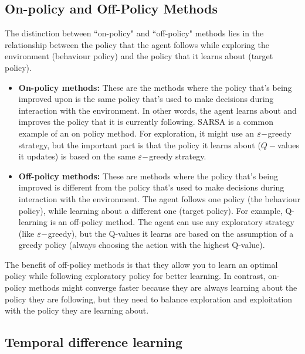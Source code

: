\subsection{On-policy and Off-Policy Methods}
The distinction between ``on-policy" and ``off-policy" methods lies in the relationship between the policy that the agent follows while exploring the environment (behaviour policy) and the policy that it learns about (target policy). 

\begin{itemize}
    \item \textbf{On-policy methods:} 
    These are the methods where the policy that's being improved upon is the same policy that's used to make decisions during interaction with the environment. In other words, the agent learns about and improves the policy that it is currently following. SARSA is a common example of an on policy method. For exploration, it might use an $\varepsilon-$greedy strategy, but the important part is that the policy it learns about ($Q-$values it updates) is based on the same $\varepsilon-$greedy strategy. 

    \item \textbf{Off-policy methods:} 
    These are methods where the policy that's being improved is different from the policy that's used to make decisions during interaction with the environment.
    The agent follows one policy (the behaviour policy), while learning about a different one (target policy). 
    For example, Q-learning is an off-policy method. The agent can use any exploratory strategy (like $\varepsilon-$greedy), but the Q-values it learns are based on the assumption of a greedy policy (always choosing the action with the highest Q-value). 
\end{itemize}
 The benefit of off-policy methods is that they allow you to learn an optimal policy while following exploratory policy for better learning. In contrast, on-policy methods might converge faster because they are always learning about the policy they are following, but they need to balance exploration and exploitation with the policy they are learning about. 


\subsection{Temporal difference learning}

